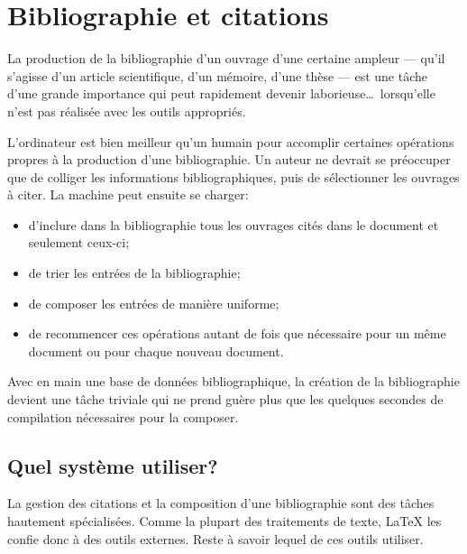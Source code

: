 
\chapter{Bibliographie et citations}
\label{chap:bibliographie}

\nobibliography*

La production de la bibliographie d'un ouvrage d'une certaine ampleur
--- qu'il s'agisse d'un article scientifique, d'un mémoire, d'une
thèse --- est une tâche d'une grande importance qui peut rapidement devenir
laborieuse\dots\ lorsqu'elle n'est pas réalisée avec les outils appropriés.

L'ordinateur est bien meilleur qu'un humain pour accomplir certaines
opérations propres à la production d'une bibliographie. Un auteur ne
devrait se préoccuper que de colliger les informations
bibliographiques, puis de sélectionner les ouvrages à citer. La
machine peut ensuite se charger:
\begin{itemize}
\item d'inclure dans la bibliographie tous les ouvrages cités dans le
  document et seulement ceux-ci;
\item de trier les entrées de la bibliographie;
\item de composer les entrées de manière uniforme;
\item de recommencer ces opérations autant de fois que nécessaire pour
  un même document ou pour chaque nouveau document.
\end{itemize}

Avec en main une base de données bibliographique, la création de la
bibliographie devient une tâche triviale qui ne prend guère plus que
les quelques secondes de compilation nécessaires pour la composer.



\section{Quel système utiliser?}
\label{sec:bibliographie:systeme}

La gestion des citations et la composition d'une bibliographie sont
des tâches hautement spécialisées. Comme la plupart des traitements de
texte, {\LaTeX} les confie donc à des outils externes. Reste à savoir
lequel de ces outils utiliser.

